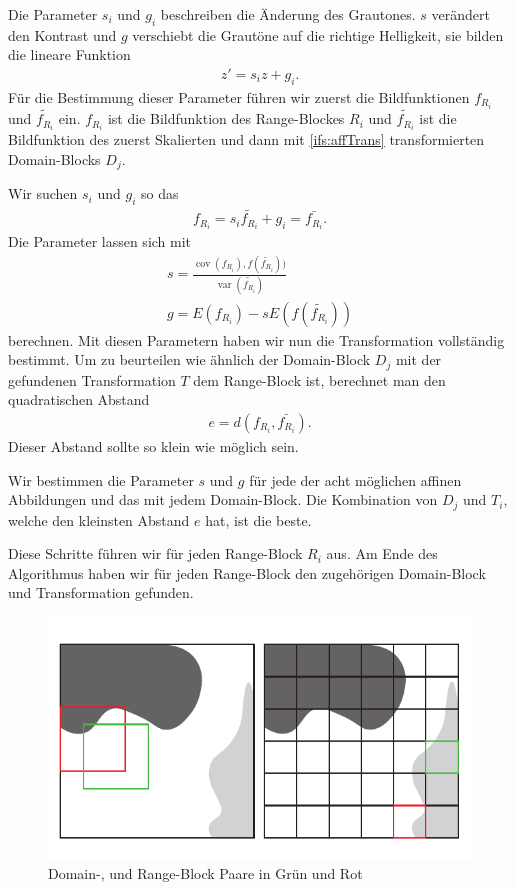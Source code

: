 Die Parameter $s_i$ und $g_i$ beschreiben die Änderung des Grautones. $s$ verändert den Kontrast und $g$ verschiebt die Grautöne auf die richtige Helligkeit, sie bilden die lineare Funktion
\begin{align*}
	z' = s_i z + g_i.
\end{align*}
Für die Bestimmung dieser Parameter führen wir zuerst die Bildfunktionen $f_{R_i}$ und $\tilde{f_{R_i}}$ ein.
$f_{R_i}$ ist die Bildfunktion des Range-Blockes $R_i$ und $\tilde{f_{R_i}}$ ist die Bildfunktion des zuerst Skalierten und dann mit \ref{ifs:affTrans} transformierten Domain-Blocks $D_j$.

Wir suchen $s_i$ und $g_i$ so das
\begin{align*}
	f_{R_i} = s_i \tilde{f_{R_i}} + g_i = \bar{f_{R_i}}.
\end{align*}
Die Parameter lassen sich mit
\begin{align*}	
	s = \frac{\operatorname{cov}(f_{R_i}), f(\tilde{f_{R_i}}))}{\operatorname{var}(\tilde{f_{R_i}})} \\
	g = E(f_{R_i}) - s E(f(\tilde{f_{R_i}}))
\end{align*}
berechnen.
Mit diesen Parametern haben wir nun die Transformation vollständig bestimmt.
Um zu beurteilen wie ähnlich der Domain-Block $D_j$ mit der gefundenen Transformation $T$ dem Range-Block ist, berechnet man den quadratischen Abstand
\begin{align*}
	e = d(f_{R_i}, \bar{f_{R_i}}).
\end{align*}
Dieser Abstand sollte so klein wie möglich sein.

Wir bestimmen die Parameter $s$ und $g$ für jede der acht möglichen affinen Abbildungen und das mit jedem Domain-Block.
Die Kombination von $D_j$ und $T_i$, welche den kleinsten Abstand $e$ hat, ist die beste.

Diese Schritte führen wir für jeden Range-Block $R_i$ aus.
Am Ende des Algorithmus haben wir für jeden Range-Block den zugehörigen Domain-Block und Transformation gefunden.

\begin{figure}	
	\centering
	\includegraphics[width=\textwidth]{papers/ifs/images/FIC}
	\caption{Domain-, und Range-Block Paare in Grün und Rot}
	\label{ifs:FIC}
\end{figure}


